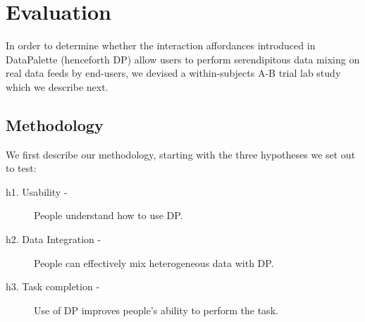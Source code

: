 \documentclass{sigchi}
\begin{document}
\section{Evaluation}

In order to determine whether the interaction affordances introduced in DataPalette (henceforth DP) allow users to perform serendipitous data mixing on real data feeds by end-users, we devised a within-subjects A-B trial lab study which we describe next.

\subsection{Methodology}

We first describe our methodology, starting with the three hypotheses we set out to test:




\begin{description}
\item [h1. Usability -] People understand how to use DP.
\item [h2. Data Integration -] People can effectively mix heterogeneous data with DP.
\item [h3. Task completion -] Use of DP improves people's ability to perform the task.
\end{description}
\end{document}
